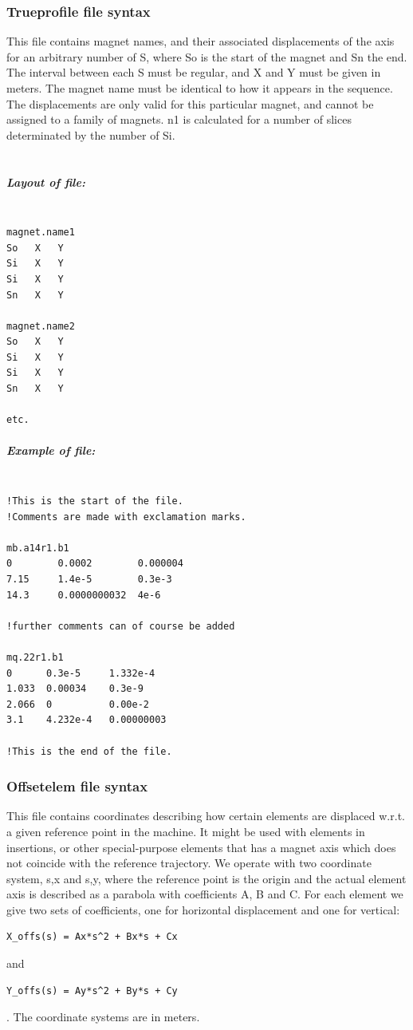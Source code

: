 \begin{itemize}
\subsubsection{Trueprofile file syntax} This file contains magnet names, and their associated displacements of the axis for  an arbitrary number of S, where So is the start of the magnet and Sn the end. The interval between each S must be regular, and X and Y  must be given in meters. The magnet name must be identical to how it appears in the  sequence. The displacements are only valid for this particular magnet, and cannot be  assigned to a family of magnets. n1 is calculated for a number of slices determinated by the number of Si.
\\
\\

\subparagraph{Layout of file:}
\begin{verbatim}

magnet.name1
So   X   Y
Si   X   Y
Si   X   Y
Sn   X   Y

magnet.name2
So   X   Y
Si   X   Y
Si   X   Y
Sn   X   Y

etc.
\end{verbatim}

\subparagraph{Example of file:}
\begin{verbatim}

!This is the start of the file.
!Comments are made with exclamation marks.

mb.a14r1.b1
0        0.0002        0.000004
7.15     1.4e-5        0.3e-3
14.3     0.0000000032  4e-6

!further comments can of course be added

mq.22r1.b1
0      0.3e-5     1.332e-4
1.033  0.00034    0.3e-9
2.066  0          0.00e-2
3.1    4.232e-4   0.00000003

!This is the end of the file.

\end{verbatim}%

\subsubsection{Offsetelem file syntax} This file contains coordinates describing how certain elements are displaced w.r.t. a  given reference point in the machine. It might be used with elements in insertions, or other special-purpose elements that has a magnet axis which does not coincide with the reference trajectory. We operate with two coordinate system, s,x and s,y, where the reference point is the origin and the actual element axis is described as a parabola with coefficients A, B and C. For each element we give two sets of coefficients, one for horizontal displacement and one for vertical: 
\begin{verbatim}
X_offs(s) = Ax*s^2 + Bx*s + Cx \end{verbatim}and 
\begin{verbatim}
Y_offs(s) = Ay*s^2 + By*s + Cy\end{verbatim}. The coordinate systems are in meters. 
\\


\end{itemize}

